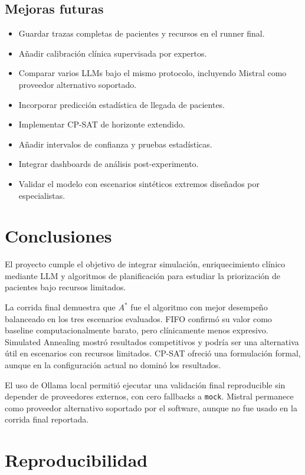 \documentclass[12pt,a4paper]{article}
\begin{document}
\subsection{Mejoras futuras}

\begin{itemize}
    \item Guardar trazas completas de pacientes y recursos en el runner final.
    \item Añadir calibración clínica supervisada por expertos.
    \item Comparar varios LLMs bajo el mismo protocolo, incluyendo Mistral como proveedor alternativo soportado.
    \item Incorporar predicción estadística de llegada de pacientes.
    \item Implementar CP-SAT de horizonte extendido.
    \item Añadir intervalos de confianza y pruebas estadísticas.
    \item Integrar dashboards de análisis post-experimento.
    \item Validar el modelo con escenarios sintéticos extremos diseñados por especialistas.
\end{itemize}

\section{Conclusiones}

El proyecto cumple el objetivo de integrar simulación, enriquecimiento clínico mediante LLM y algoritmos de planificación para estudiar la priorización de pacientes bajo recursos limitados.

La corrida final demuestra que $A^*$ fue el algoritmo con mejor desempeño balanceado en los tres escenarios evaluados. FIFO confirmó su valor como baseline computacionalmente barato, pero clínicamente menos expresivo. Simulated Annealing mostró resultados competitivos y podría ser una alternativa útil en escenarios con recursos limitados. CP-SAT ofreció una formulación formal, aunque en la configuración actual no dominó los resultados.

El uso de Ollama local permitió ejecutar una validación final reproducible sin depender de proveedores externos, con cero fallbacks a \texttt{mock}. Mistral permanece como proveedor alternativo soportado por el software, aunque no fue usado en la corrida final reportada.

\section{Reproducibilidad}
\end{document}
